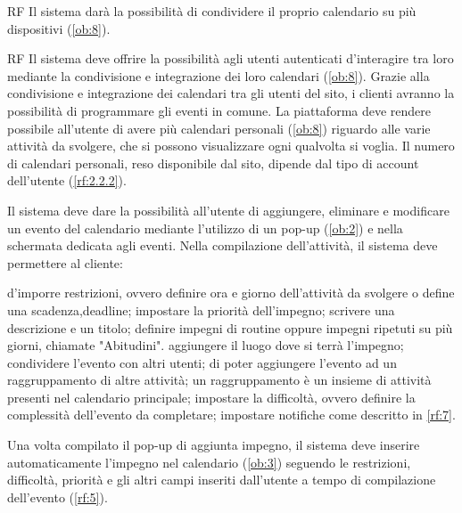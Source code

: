 \begin{listaPersonale}{RF}
	 Il sistema darà la possibilità di condividere il proprio calendario su più dispositivi (\ref{ob:8}).

	\begin{listaPersonale2}{RF}
		 Il sistema deve offrire la possibilità agli utenti autenticati d'interagire tra loro mediante la condivisione e integrazione dei loro calendari (\ref{ob:8}). Grazie alla condivisione e integrazione dei calendari tra gli utenti del sito, i clienti avranno la possibilità di programmare gli eventi in comune.
		 La piattaforma deve rendere possibile all’utente di avere più calendari personali (\ref{ob:8}) riguardo alle varie attività da svolgere, che si possono visualizzare ogni qualvolta si voglia. Il numero di calendari personali, reso disponibile dal sito, dipende dal tipo di account dell’utente (\ref{rf:2.2.2}).
	\end{listaPersonale2}

	 Il sistema deve dare la possibilità all'utente di aggiungere, eliminare e modificare un evento del calendario mediante l'utilizzo di un pop-up (\ref{ob:2}) e nella schermata dedicata agli eventi. Nella compilazione dell'attività, il sistema deve permettere al cliente:
	\begin{listaPersonale2}{}
		 d'imporre restrizioni, ovvero definire ora e giorno dell'attività da svolgere o define una scadenza,deadline;
		 impostare la priorità dell'impegno;
		 scrivere una descrizione e un titolo;
		 definire impegni di routine oppure impegni ripetuti su più giorni, chiamate "Abitudini".
		 aggiungere il luogo dove si terrà l'impegno;
		 condividere l'evento con altri utenti;
		 di poter aggiungere l'evento ad un raggruppamento di altre attività; un raggruppamento è un insieme di attività presenti nel calendario principale;
		 impostare la difficoltà, ovvero definire la complessità dell'evento da completare;
		 impostare notifiche come descritto in \ref{rf:7}.
	\end{listaPersonale2}


	 Una volta compilato il pop-up di aggiunta impegno, il sistema deve inserire automaticamente l'impegno nel calendario (\ref{ob:3}) seguendo le restrizioni, difficoltà, priorità e gli altri campi inseriti dall'utente a tempo di compilazione dell'evento (\ref{rf:5}).


\end{listaPersonale}
